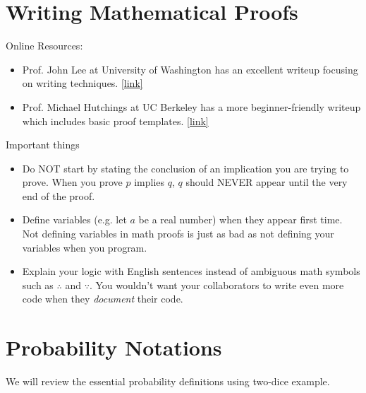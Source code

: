 \documentclass{discussion}
\begin{document}

\section{Writing Mathematical Proofs}

Online Resources:
\begin{itemize}
\item Prof. John Lee at University of Washington has an excellent writeup focusing on writing techniques. \href{https://www.math.washington.edu/~lee/Writing/writing-proofs.pdf}{[link]}
\item Prof. Michael Hutchings at UC Berkeley has a more beginner-friendly writeup which includes basic proof templates. \href{https://math.berkeley.edu/~hutching/teach/proofs.pdf}{[link]}
\end{itemize}

Important things
\begin{itemize}
\item Do NOT start by stating the conclusion of an implication you are trying to prove. When you  prove $p$ implies $q$, $q$ should NEVER appear until the very end of the proof.
\item Define variables (e.g. let $a$ be a real number) when they appear first time. Not defining variables in math proofs is just as bad as not defining your variables when you program.
\item Explain your logic with English sentences instead of ambiguous math symbols such as $\therefore$ and $\because$.  You wouldn't want your collaborators to write even more code when they \emph{document} their code.
\end{itemize}

\section{Probability Notations}
We will review the essential probability definitions using two-dice example.

\newcommand{\var}{\mathrm{Var}}
\renewcommand{\E}{\mathbb{E}}
\end{document}
